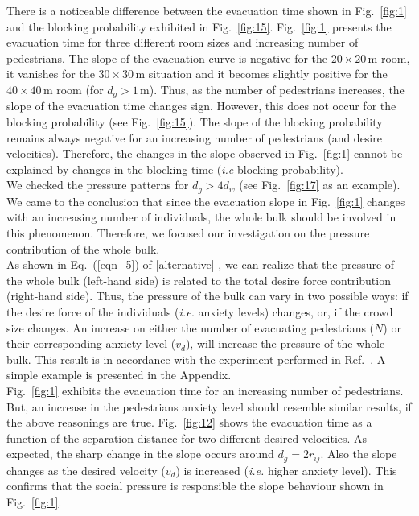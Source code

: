There is a noticeable difference between the evacuation time 
shown in Fig.~\ref{fig:1} and the blocking probability exhibited in 
Fig.~\ref{fig:15}. Fig.~\ref{fig:1} presents the evacuation time for three 
different room sizes and increasing number of pedestrians.  The slope of the 
evacuation curve is negative for the $20\times20\,$m room, it vanishes for 
the $30\times30\,$m situation and it becomes slightly positive for the 
$40\times40\,$m room (for $d_g>1\,$m). Thus, as the number of pedestrians 
increases, the slope of the evacuation time changes sign. However, this does not 
occur for the blocking probability (see Fig.~\ref{fig:15}). The slope of the 
blocking probability remains always negative for an increasing number of 
pedestrians (and desire velocities). Therefore, the changes in the slope 
observed in Fig.~\ref{fig:1} cannot be explained by changes in the blocking 
time (\textit{i.e} blocking probability).   \\

We checked the pressure patterns for $d_g>4d_w$ (see Fig.~\ref{fig:17} as an 
example). We came to the conclusion that since the evacuation slope in 
Fig.~\ref{fig:1} changes with an increasing number of individuals, the whole 
bulk should be involved in this phenomenon. Therefore, we focused our 
investigation on the pressure contribution of the whole bulk.  \\ 

As shown in Eq.~(\ref{eqn_5}) of \ref{alternative} , we can realize that the pressure of the 
whole bulk (left-hand side) is related to the total desire force contribution 
(right-hand side). Thus, the pressure of the bulk can vary in two possible 
ways: if the desire force of the individuals (\emph{i.e.} anxiety levels) 
changes, or, if the crowd size changes. An increase on either 
the number of evacuating pedestrians ($N$) or their corresponding anxiety 
level ($v_d$), will increase the pressure of the whole bulk. {\color{red} This result is in accordance with the experiment performed in Ref.~\cite{Pastor}.}
A simple example is presented in the Appendix. \\

Fig.~\ref{fig:1} exhibits the evacuation time for an increasing number of 
pedestrians. But, an increase in the pedestrians anxiety level should  
resemble similar results, if the above reasonings are true. Fig.~\ref{fig:12} 
shows the evacuation time as a function of the separation distance for two 
different desired velocities. As expected, the sharp change in the slope occurs 
around $d_g=2r_{ij}$. Also the slope changes as the desired velocity ($v_d$) is 
increased (\emph{i.e.} higher anxiety level). This confirms that the social 
pressure is responsible the slope behaviour shown in Fig.~\ref{fig:1}. \\

